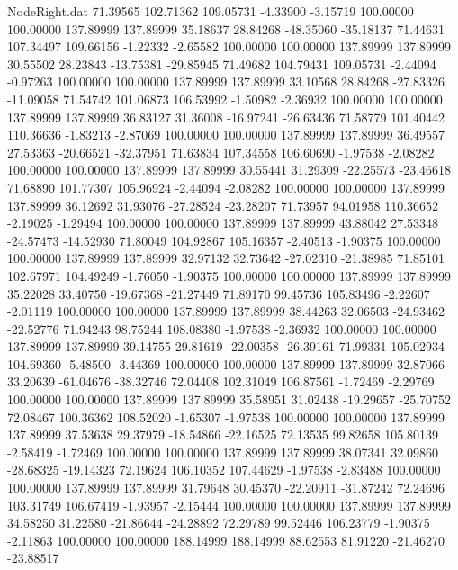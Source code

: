 \begin{filecontents}{NodeRight.dat}
  71.39565  102.71362  109.05731    -4.33900   -3.15719  100.00000  100.00000  137.89999  137.89999   35.18637   28.84268  -48.35060  -35.18137
  71.44631  107.34497  109.66156    -1.22332   -2.65582  100.00000  100.00000  137.89999  137.89999   30.55502   28.23843  -13.75381  -29.85945
  71.49682  104.79431  109.05731    -2.44094   -0.97263  100.00000  100.00000  137.89999  137.89999   33.10568   28.84268  -27.83326  -11.09058
  71.54742  101.06873  106.53992    -1.50982   -2.36932  100.00000  100.00000  137.89999  137.89999   36.83127   31.36008  -16.97241  -26.63436
  71.58779  101.40442  110.36636    -1.83213   -2.87069  100.00000  100.00000  137.89999  137.89999   36.49557   27.53363  -20.66521  -32.37951
  71.63834  107.34558  106.60690    -1.97538   -2.08282  100.00000  100.00000  137.89999  137.89999   30.55441   31.29309  -22.25573  -23.46618
  71.68890  101.77307  105.96924    -2.44094   -2.08282  100.00000  100.00000  137.89999  137.89999   36.12692   31.93076  -27.28524  -23.28207
  71.73957   94.01958  110.36652    -2.19025   -1.29494  100.00000  100.00000  137.89999  137.89999   43.88042   27.53348  -24.57473  -14.52930
  71.80049  104.92867  105.16357    -2.40513   -1.90375  100.00000  100.00000  137.89999  137.89999   32.97132   32.73642  -27.02310  -21.38985
  71.85101  102.67971  104.49249    -1.76050   -1.90375  100.00000  100.00000  137.89999  137.89999   35.22028   33.40750  -19.67368  -21.27449
  71.89170   99.45736  105.83496    -2.22607   -2.01119  100.00000  100.00000  137.89999  137.89999   38.44263   32.06503  -24.93462  -22.52776
  71.94243   98.75244  108.08380    -1.97538   -2.36932  100.00000  100.00000  137.89999  137.89999   39.14755   29.81619  -22.00358  -26.39161
  71.99331  105.02934  104.69360    -5.48500   -3.44369  100.00000  100.00000  137.89999  137.89999   32.87066   33.20639  -61.04676  -38.32746
  72.04408  102.31049  106.87561    -1.72469   -2.29769  100.00000  100.00000  137.89999  137.89999   35.58951   31.02438  -19.29657  -25.70752
  72.08467  100.36362  108.52020    -1.65307   -1.97538  100.00000  100.00000  137.89999  137.89999   37.53638   29.37979  -18.54866  -22.16525
  72.13535   99.82658  105.80139    -2.58419   -1.72469  100.00000  100.00000  137.89999  137.89999   38.07341   32.09860  -28.68325  -19.14323
  72.19624  106.10352  107.44629    -1.97538   -2.83488  100.00000  100.00000  137.89999  137.89999   31.79648   30.45370  -22.20911  -31.87242
  72.24696  103.31749  106.67419    -1.93957   -2.15444  100.00000  100.00000  137.89999  137.89999   34.58250   31.22580  -21.86644  -24.28892
  72.29789   99.52446  106.23779    -1.90375   -2.11863  100.00000  100.00000  188.14999  188.14999   88.62553   81.91220  -21.46270  -23.88517

\end{filecontents}
